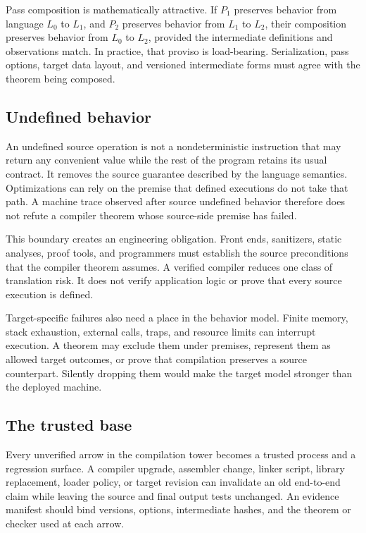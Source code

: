 Pass composition is mathematically attractive. If \(P_1\) preserves behavior
from language \(L_0\) to \(L_1\), and \(P_2\) preserves behavior from \(L_1\)
to \(L_2\), their composition preserves behavior from \(L_0\) to \(L_2\),
provided the intermediate definitions and observations match. In practice,
that proviso is load-bearing. Serialization, pass options, target data layout,
and versioned intermediate forms must agree with the theorem being composed.

\subsection{Undefined behavior}

An undefined source operation is not a nondeterministic instruction that may
return any convenient value while the rest of the program retains its usual
contract. It removes the source guarantee described by the language semantics.
Optimizations can rely on the premise that defined executions do not take that
path. A machine trace observed after source undefined behavior therefore does
not refute a compiler theorem whose source-side premise has failed.

This boundary creates an engineering obligation. Front ends, sanitizers,
static analyses, proof tools, and programmers must establish the source
preconditions that the compiler theorem assumes. A verified compiler reduces
one class of translation risk. It does not verify application logic or prove
that every source execution is defined.

Target-specific failures also need a place in the behavior model. Finite
memory, stack exhaustion, external calls, traps, and resource limits can
interrupt execution. A theorem may exclude them under premises, represent
them as allowed target outcomes, or prove that compilation preserves a source
counterpart. Silently dropping them would make the target model stronger than
the deployed machine.

\subsection{The trusted base}

Every unverified arrow in the compilation tower becomes a trusted process and
a regression surface. A compiler upgrade, assembler change, linker script,
library replacement, loader policy, or target revision can invalidate an old
end-to-end claim while leaving the source and final output tests unchanged.
An evidence manifest should bind versions, options, intermediate hashes, and
the theorem or checker used at each arrow.

